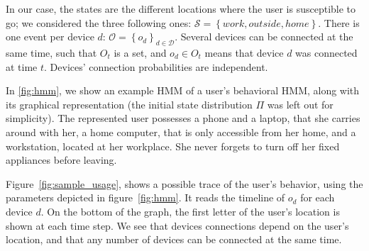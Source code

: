 In our case, the states are the different locations where the user is susceptible to go;
we considered the three following ones: $\mathcal{S}=\left\{ \mathit{work}, \mathit{outside}, \mathit{home} \right\}$. 
There is one event per device $d$: $\mathcal{O} = \left\{ o_d \right\}_{d\in \mathcal{D}}$. Several devices can be connected at the same time, such that $O_t$ is a set, and $o_d \in O_t$ means that device $d$ was connected at time $t$. Devices' connection probabilities are independent.

In \cref{fig:hmm}, we show an example HMM of a user's behavioral HMM, along with its graphical representation (the initial state distribution $\Pi$ was left out for simplicity). 
The represented user possesses a phone and a laptop, that she carries around with her, a home computer, that is only accessible from her home, and a workstation, located at her workplace. She never forgets to turn off her fixed appliances before leaving.







Figure~\ref{fig:sample_usage}, shows a possible trace of the user's behavior, using the parameters depicted in figure~\ref{fig:hmm}. 
It reads the timeline of $o_{d}$ for each device $d$. On the bottom of the graph, the first letter of the user's location is shown at each time step.
We see that devices connections depend on the user's location, and that any number of devices can be connected at the same time.

